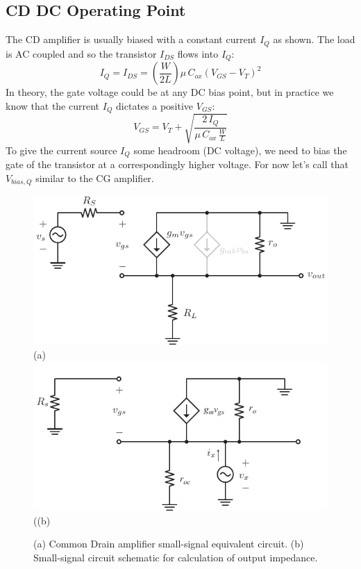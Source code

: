 \subsection{CD DC Operating Point}
The CD amplifier is usually biased with a constant current $I_Q$ as shown.  The load is AC coupled and so the transistor $I_{DS}$ flows into $I_Q$:
    \begin{equation}
        I_Q = I_{DS} = \left(\frac{W}{2L}\right)\mu\,C_{ox}{(V_{GS} - V_T)}^2	
    \end{equation}
In theory, the gate voltage could be at any DC bias point, but in practice we know that the current $I_Q$ dictates a positive $V_{GS}$:
    \begin{equation}
        V_{GS} = V_T + \sqrt{\frac{2\,I_{Q}}{\mu\,C_{ox}\,\frac{W}{L}}}
    \end{equation}
To give the current source $I_Q$ some headroom (DC voltage), we need to bias the gate of the transistor at a correspondingly higher voltage.  For now let's call that $V_{bias,Q}$ similar to the CG amplifier.
\newpage
\begin{figure}[t]
\centering
\includegraphics[scale=1.25]{cd_amp_ss_av2}\\
(a)\\
\includegraphics[scale=1.25]{cd_amp_ss_rout}\\
((b)\\
\caption{(a) Common Drain amplifier small-signal equivalent circuit.  (b) Small-signal circuit schematic for calculation of output impedance.}
\label{fig:cd_amp_ss_av2}
\end{figure}
